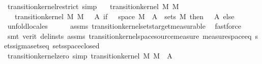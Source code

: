 \begin{isabellebody}
{}%
\isamarkupfalse%
\ transition{\isacharunderscore}{\kern0pt}kernel{\isacharunderscore}{\kern0pt}restrict\ {\isacharbrackleft}{\kern0pt}simp{\isacharbrackright}{\kern0pt}{\isacharcolon}{\kern0pt}\isanewline
\ \ \ {\isachardoublequoteopen}transition{\isacharunderscore}{\kern0pt}kernel\ M\ M{\isacharprime}{\kern0pt}\ {\isasymkappa}{\isachardoublequoteclose}\isanewline
\ \ \ {\isachardoublequoteopen}transition{\isacharunderscore}{\kern0pt}kernel\ M\ M{\isacharprime}{\kern0pt}\ {\isacharparenleft}{\kern0pt}{\isasymlambda}\ {\isasymomega}\ A{\isacharprime}{\kern0pt}{\isachardot}{\kern0pt}\ if\ {\isasymomega}\ {\isasymin}\ space\ M\ {\isasymand}\ A{\isacharprime}{\kern0pt}\ {\isasymin}\ sets\ M{\isacharprime}{\kern0pt}\ then\ {\isasymkappa}\ {\isasymomega}\ A{\isacharprime}{\kern0pt}\ else\ {}{\isacharparenright}{\kern0pt}{\isachardoublequoteclose}\isanewline
%
\isadelimproof
\ \ %
\endisadelimproof
%
\isatagproof
{}\isamarkupfalse%
\ {\isacharparenleft}{\kern0pt}unfold{\isacharunderscore}{\kern0pt}locales{\isacharparenright}{\kern0pt}\isanewline
\ \ \ \ \isamarkupfalse%
\ assms\ transition{\isacharunderscore}{\kern0pt}kernel{\isachardot}{\kern0pt}sets{\isacharunderscore}{\kern0pt}target{\isacharunderscore}{\kern0pt}measurable\ \isamarkupfalse%
\ fastforce\isanewline
\ \ \ \ \isamarkupfalse%
\ {\isacharparenleft}{\kern0pt}smt\ {\isacharparenleft}{\kern0pt}verit{\isacharcomma}{\kern0pt}\ del{\isacharunderscore}{\kern0pt}insts{\isacharparenright}{\kern0pt}\ assms\ transition{\isacharunderscore}{\kern0pt}kernel{\isachardot}{\kern0pt}space{\isacharunderscore}{\kern0pt}source{\isacharunderscore}{\kern0pt}measure\ measure{\isacharunderscore}{\kern0pt}space{\isacharunderscore}{\kern0pt}eq\ sets{\isachardot}{\kern0pt}sigma{\isacharunderscore}{\kern0pt}sets{\isacharunderscore}{\kern0pt}eq\ sets{\isachardot}{\kern0pt}space{\isacharunderscore}{\kern0pt}closed{\isacharparenright}{\kern0pt}\isanewline
\ \ \ \ \isamarkupfalse%
%
\endisatagproof
{\isafoldproof}%
%
\isadelimproof
\isanewline
%
\endisadelimproof
\isanewline
{}\isamarkupfalse%
\ transition{\isacharunderscore}{\kern0pt}kernel{\isacharunderscore}{\kern0pt}zero\ {\isacharbrackleft}{\kern0pt}simp{\isacharbrackright}{\kern0pt}{\isacharcolon}{\kern0pt}\ {\isachardoublequoteopen}transition{\isacharunderscore}{\kern0pt}kernel\ M\ M{\isacharprime}{\kern0pt}\ {\isacharparenleft}{\kern0pt}{\isasymlambda}{\isasymomega}\ A{\isacharprime}{\kern0pt}{\isachardot}{\kern0pt}\ {}{\isacharparenright}{\kern0pt}{\isachardoublequoteclose}\isanewline

\end{isabellebody}
